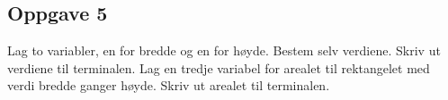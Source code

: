 \documentclass{article}
\begin{document}
\subsection*{Oppgave 5}
Lag to variabler, en for bredde og en for høyde. Bestem selv verdiene. Skriv ut verdiene til terminalen. Lag en tredje variabel for arealet til rektangelet med verdi bredde ganger høyde. Skriv ut arealet til terminalen.



\end{document}
